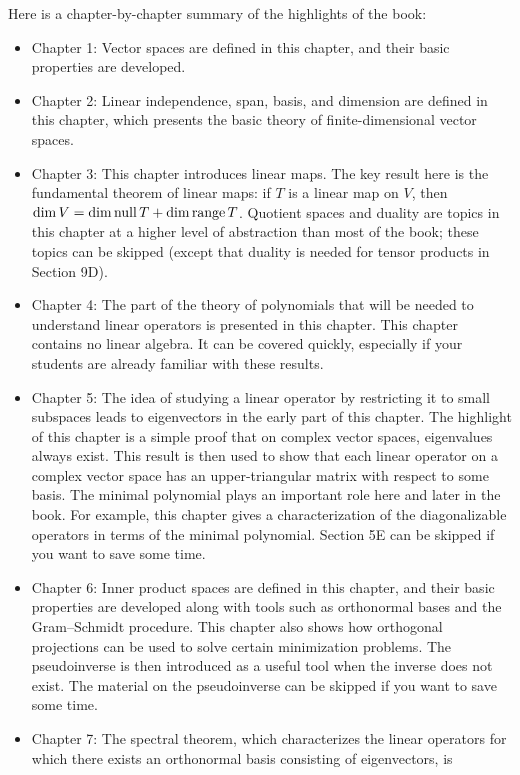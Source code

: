 Here is a chapter-by-chapter summary of the highlights of the book:
\begin{itemize}
\item Chapter 1: Vector spaces are defined in this chapter, and their basic
  properties are developed.
\item Chapter 2: Linear independence, span, basis, and dimension are defined in
  this chapter, which presents the basic theory of finite-dimensional vector
  spaces.
\item Chapter 3: This chapter introduces linear maps. The key result here is
  the fundamental theorem of linear maps: if $T$ is a linear map on $V$, then
  $\operatorname{dim} V=\operatorname{dim}\operatorname{null} T+\operatorname{dim}\operatorname{range} T$. Quotient spaces and duality are topics in
  this chapter at a higher level of abstraction than most of the book; these
  topics can be skipped (except that duality is needed for tensor products in
  Section 9D).
\item Chapter 4: The part of the theory of polynomials that will be needed to
  understand linear operators is presented in this chapter. This chapter
  contains no linear algebra. It can be covered quickly, especially if your
  students are already familiar with these results.
\item Chapter 5: The idea of studying a linear operator by restricting it to
  small subspaces leads to eigenvectors in the early part of this chapter. The
  highlight of this chapter is a simple proof that on complex vector spaces,
  eigenvalues always exist. This result is then used to show that each linear
  operator on a complex vector space has an upper-triangular matrix with
  respect to some basis. The minimal polynomial plays an important role here
  and later in the book. For example, this chapter gives a characterization of
  the diagonalizable operators in terms of the minimal polynomial. Section 5E
  can be skipped if you want to save some time.
\item Chapter 6: Inner product spaces are defined in this chapter, and their
  basic properties are developed along with tools such as orthonormal bases and
  the Gram--Schmidt procedure. This chapter also shows how orthogonal
  projections can be used to solve certain minimization problems. The
  pseudoinverse is then introduced as a useful tool when the inverse does not
  exist. The material on the pseudoinverse can be skipped if you want to save
  some time.
\item Chapter 7: The spectral theorem, which characterizes the linear operators
  for which there exists an orthonormal basis consisting of eigenvectors, is

\end{itemize}
